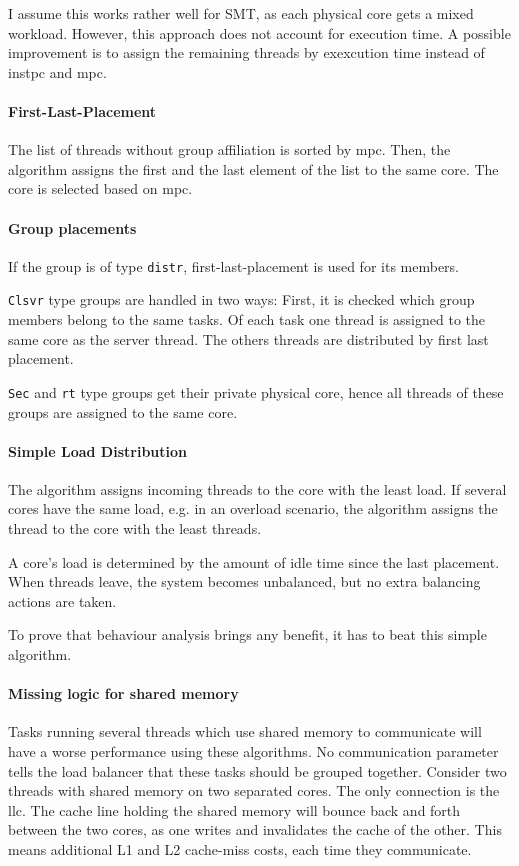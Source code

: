 I assume this works rather well for SMT, as each physical core gets a mixed
workload.
However, this approach does not account for execution time.
A possible improvement is to assign the remaining threads by
exexcution time instead of \gls{instpc} and \gls{mpc}.


\paragraph{First-Last-Placement}
The list of threads without group affiliation is sorted by \gls{mpc}.
Then, the algorithm assigns the first and the last element of the list to the
same core.
The core is selected based on \gls{mpc}.


\paragraph{Group placements}
If the group is of type \texttt{distr}, first-last-placement is used for its
members.

\texttt{Clsvr} type groups are handled in two ways: First, it is checked which
group members belong to the same tasks.
Of each task one thread is assigned to the same core as the server thread.
The others threads are distributed by first last placement.

\texttt{Sec} and \texttt{rt} type groups get their private physical core, hence
all threads of these groups are assigned to the same core.


\paragraph{Simple Load Distribution}
The algorithm assigns incoming threads to the core with the least load.
If several cores have the same load, e.g. in an overload scenario, the
algorithm assigns the thread to the core with the least threads.

A core's load is determined by the amount of idle time since the last
placement.
When threads leave, the system becomes unbalanced, but no extra balancing
actions are taken.

To prove that behaviour analysis brings any benefit, it has to beat
this simple algorithm.


\paragraph{Missing logic for shared memory}
Tasks running several threads which use shared memory to communicate will have
a worse performance using these algorithms.
No communication parameter tells the load balancer that these tasks should be
grouped together.
Consider two threads with shared memory on two separated cores.
The only connection is the \gls{llc}.
The cache line holding the shared memory will bounce back and forth between
the two cores, as one writes and invalidates the cache of the other.
This means additional L1 and L2 cache-miss costs, each time they communicate.

